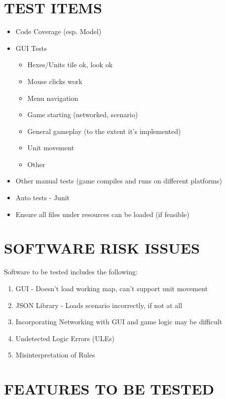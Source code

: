 \section[TEST ITEMS]{\bfseries\color{black} TEST ITEMS}
{\color{black}
\begin{itemize}
\item Code Coverage (esp. Model)
\item GUI Tests
\begin{itemize}
\item Hexes/Units tile ok, look ok
\item Mouse clicks work
\item Menu navigation
\item Game starting (networked, scenario)
\item General gameplay (to the extent it's implemented)
\item Unit movement
\item Other
\end{itemize}
\item Other manual tests (game compiles and runs on different platforms)
\item Auto tests - Junit
\item Ensure all files under resources can be loaded (if feasible)
\end{itemize}
}

\section[SOFTWARE RISK ISSUES]{\bfseries\color{black} SOFTWARE RISK ISSUES}
{\color{black}
Software to be tested includes the following:

\begin{enumerate}
\item  GUI - Doesn't load working map, can't support unit movement
\item  JSON Library - Loads scenario incorrectly, if not at all
\item  Incorporating Networking with GUI and game logic may be difficult
\item  Undetected Logic Errors (ULEs)
\item  Misinterpretation of Rules
\end{enumerate}
}

\section[FEATURES TO BE TESTED]{\bfseries\color{black} FEATURES TO BE TESTED}

